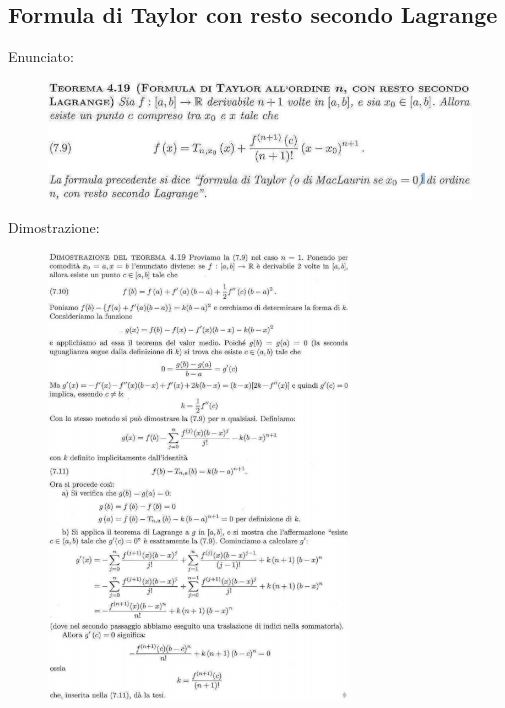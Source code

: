 \documentclass[a4paper, 9pt]{report}
\begin{document}
\subsection*{Formula di Taylor con resto secondo Lagrange}
Enunciato:
\begin{figure}[h!]
    \includegraphics[width=\linewidth]{../dim/taylorlagrange1.PNG}
\end{figure}
\newline
Dimostrazione:\begin{figure}[h!]
    \includegraphics[width=300px]{../dim/taylorlagrange2.PNG}
\end{figure}
\newline
\newpage
\end{document}
